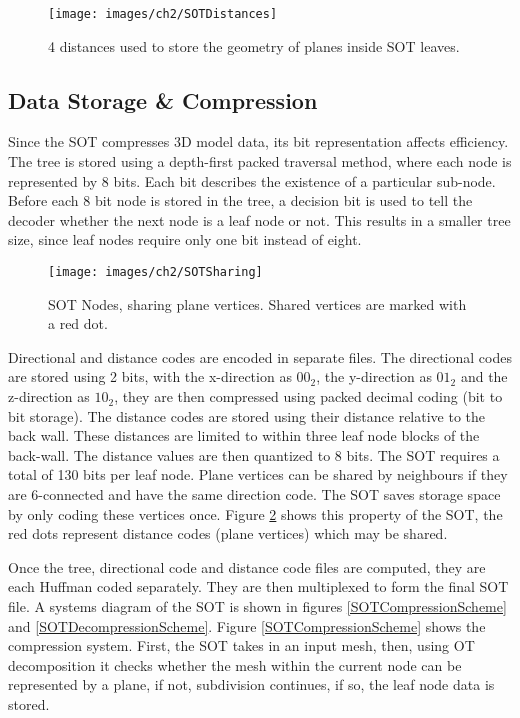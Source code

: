 \begin{figure}[!h]
\centering
\texttt{[image: images/ch2/SOTDistances]}
\caption{4 distances used to store the geometry of planes inside SOT leaves.}
\label{SOTDistances}
\end{figure}

\subsection{Data Storage \& Compression}

Since the SOT compresses 3D model data, its bit representation affects efficiency. The tree is stored using a depth-first packed traversal method, where each node is represented by 8 bits. Each bit describes the existence of a particular sub-node. Before each 8 bit node is stored in the tree, a decision bit is used to tell the decoder whether the next node is a leaf node or not. This results in a smaller tree size, since leaf nodes require only one bit instead of eight. 

\begin{figure}[!h]
\centering
\texttt{[image: images/ch2/SOTSharing]}
\caption{SOT Nodes, sharing plane vertices. Shared vertices are marked with a red dot.}
\label{SOTSharing}
\end{figure}

Directional and distance codes are encoded in separate files. The directional codes are stored using 2 bits, with the x-direction as $00_2$, the y-direction as $01_2$ and the z-direction as $10_2$, they are then compressed using packed decimal coding (bit to bit storage). The distance codes are stored using their distance relative to the back wall. These distances are limited to within three leaf node blocks of the back-wall. The distance values are then quantized to 8 bits. The SOT requires a total of 130 bits per leaf node. Plane vertices can be shared by neighbours if they are 6-connected and have the same direction code. The SOT saves storage space by only coding these vertices once. Figure \ref{SOTSharing} shows this property of the SOT, the red dots represent distance codes (plane vertices) which may be shared.

Once the tree, directional code and distance code files are computed, they are each Huffman coded separately. They are then multiplexed to form the final SOT file. A systems diagram of the SOT is shown in figures \ref{SOTCompressionScheme} and \ref{SOTDecompressionScheme}. Figure \ref{SOTCompressionScheme} shows the compression system. First, the SOT takes in an input mesh, then, using OT decomposition it checks whether the mesh within the current node can be represented by a plane, if not, subdivision continues, if so, the leaf node data is stored. 

